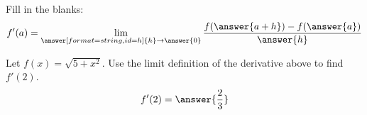 \documentclass{ximera}
\begin{document}
\begin{exercise}

Fill in the blanks:
  \[
  f'(a)=\lim_{\answer[format=string,id=h]{h}\to\answer{0}}\frac{f(\answer{a+h})-f(\answer{a})}{\answer{h}}
  \]
    
\end{exercise}

  \begin{exercise}
    Let $f(x)=\sqrt{5+x^2}$. Use the limit definition of the derivative
    above to find $f'(2)$.
    \[
    f'(2)=\answer{\frac{2}{3}}
    \]
  \end{exercise}
\end{document}
